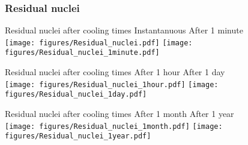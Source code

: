 \documentclass[xcolor={dvipsnames}]{beamer}
\begin{document}

\subsubsection{Residual nuclei}
\begin{frame}{Residual nuclei after cooling times}
\centering
\hspace*{1.6cm} Instantanuous \hfill After 1 minute \hspace*{1.8cm} \\
  \texttt{[image: figures/Residual\_nuclei.pdf]}
  \texttt{[image: figures/Residual\_nuclei\_1minute.pdf]}
\end{frame}
\begin{frame}{Residual nuclei after cooling times}
\centering
\hspace*{1.6cm} After 1 hour \hfill After 1 day \hspace*{1.8cm} \\
  \texttt{[image: figures/Residual\_nuclei\_1hour.pdf]}
  \texttt{[image: figures/Residual\_nuclei\_1day.pdf]}
\end{frame}
\begin{frame}{Residual nuclei after cooling times}
\centering
\hspace*{1.6cm} After 1 month \hfill After 1 year \hspace*{1.8cm} \\
  \texttt{[image: figures/Residual\_nuclei\_1month.pdf]}
  \texttt{[image: figures/Residual\_nuclei\_1year.pdf]}
\end{frame}
\end{document}
